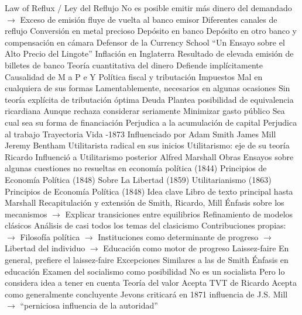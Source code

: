 \documentclass{nuevotema}
\begin{document}
\begin{esquemal}
				\4 Law of Reflux / Ley del Reflujo
				\4[] No es posible emitir más dinero del demandado
				\4[] $\to$ Exceso de emisión fluye de vuelta al banco emisor
				\4 Diferentes canales de reflujo
				\4[] Conversión en metal precioso
				\4[] Depósito en banco
				\4[] Depósito en otro banco y compensación en cámara
			\3 Defensor de la Currency School
				\4 ``Un Ensayo sobre el Alto Precio del Lingote''
				\4 Inflación en Inglaterra
				\4[] Resultado de elevada emisión de billetes de banco
				\4 Teoría cuantitativa del dinero
				\4[] Defiende implícitamente
				\4[] Causalidad de M a P e Y
		\2 Política fiscal y tributación
			\3 Impuestos
				\4 Mal en cualquiera de sus formas
				\4 Lamentablemente, necesarios en algunas ocasiones
				\4 Sin teoría explícita de tributación óptima
			\3 Deuda
				\4 Plantea posibilidad de equivalencia ricardiana
				\4[] Aunque rechaza considerar seriamente
			\3 Minimizar gasto público
				\4 Sea cual sea su forma de financiación
				\4[] Perjudica a la acumulación de capital
				\4[] Perjudica al trabajo
	\1 
		\2 Trayectoria
			\3 Vida
				-1873
			\3 Influenciado por
				\4 Adam Smith
				\4 James Mill
				\4 Jeremy Bentham
				\4[] Utilitarista radical en sus inicios
				\4[] Utilitarismo: eje de su teoría
				\4 Ricardo
			\3 Influenció a
				\4 Utilitarismo posterior
				\4 Alfred Marshall
			\3 Obras
				\4[] Ensayos sobre algunas cuestiones no resueltas en economía política (1844)
				\4 Principios de Economía Política (1848)
				\4[] Sobre La Libertad (1859)
				\4[] Utilitarianismo (1863)
		\2 Principios de Economía Política (1848)
			\3 Idea clave
				\4 Libro de texto principal hasta Marshall
				\4 Recapitulación y extensión de Smith, Ricardo, Mill
				\4 Énfasis sobre los mecanismos
				\4[] $\to$ Explicar transiciones entre equilibrios
				\4 Refinamiento de modelos clásicos
				\4 Análisis de casi todos los temas del clasicismo
			\3 Contribuciones propias:
				\4[] $\to$ Filosofía política
				\4[] $\to$ Instituciones como determinante de progreso
				\4[] $\to$ Libertad del individuo
				\4[] $\to$ Educación como motor de progreso
			\3 Laissez-faire
				\4 En general, prefiere el laissez-faire
				\4 Excepciones
				\4[$\to$] Similares a las de Smith
				\4[$\to$] Énfasis en educación
				\4 Examen del socialismo como posibilidad
				\4[] No es un socialista
				\4[] Pero lo considera idea a tener en cuenta
		\2 Teoría del valor
			\3 Acepta TVT de Ricardo
				\4 Acepta como generalmente concluyente
				\4 Jevons criticará en 1871 influencia de J.S. Mill
				\4[] $\to$ ``perniciosa influencia de la autoridad''

\end{esquemal}
\end{document}
